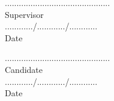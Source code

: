 \vspace{3mm} %
\begin{multicols}{2}
............................................. \\
Supervisor \\


............/............/............\\
Date \\
\end{multicols}

\vspace{3mm} %
\begin{multicols}{2}
............................................. \\
Candidate \\


............/............/............\\
Date \\
\end{multicols}

